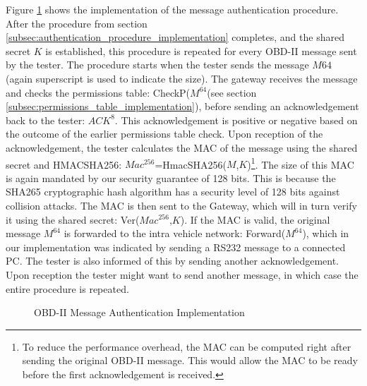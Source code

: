 Figure \ref{fig:message_authentication_implementation} shows the implementation of the message authentication procedure. After the procedure from section \ref{subsec:authentication_procedure_implementation} completes, and the shared secret $K$ is established, this procedure is repeated for every OBD-II message sent by the tester. The procedure starts when the tester sends the message $M64$ (again superscript is used to indicate the size). The gateway receives the message and checks the permissions table:  CheckP($M^{64}$(see section \ref{subsec:permissions_table_implementation}), before sending an acknowledgement back to the tester: $ACK^8$. This acknowledgement is positive or negative based on the outcome of the earlier permissions table check. Upon reception of the acknowledgement, the tester calculates the MAC of the message using the shared secret and HMAC\textunderscore SHA256: $Mac^{256}$=Hmac\textunderscore SHA256($M$,$K$)\footnote{To reduce the performance overhead, the MAC can be computed right after sending the original OBD-II message. This would allow the MAC to be ready before the first acknowledgement is received.}. The size of this MAC is again mandated by our security guarantee of 128 bits. This is because the SHA265 cryptographic hash algorithm has a security level of 128 bits against collision attacks. The MAC is then sent to the Gateway, which will in turn verify it using the shared secret: Ver($Mac^{256}$,$K$). If the MAC is valid, the original message $M^{64}$ is forwarded to the intra vehicle network: Forward($M^{64}$), which in our implementation was indicated by sending a RS232 message to a connected PC. The tester is also informed of this by sending another acknowledgement. Upon reception the tester might want to send another message, in which case the entire procedure is repeated. 

\begin{figure}[h]
	\centering
	\caption{OBD-II Message Authentication Implementation}
	\label{fig:message_authentication_implementation}
\end{figure}

